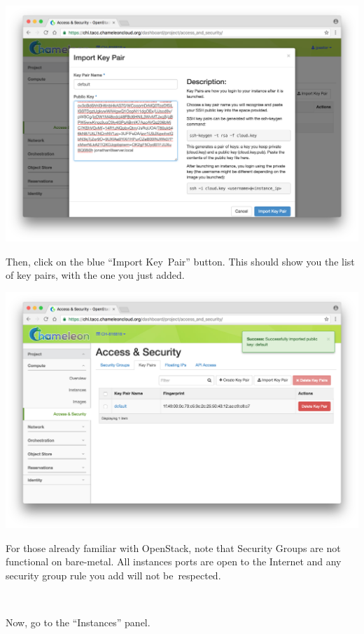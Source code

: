 \includegraphics[width=\columnwidth]{images/chameleon/Screen-Shot-2016-10-26-at-14-37-18.png}

Then, click on the blue ``Import Key~Pair'' button. This should show you
the list of key pairs, with the one you just added.

\includegraphics[width=\columnwidth]{images/chameleon/Screen-Shot-2016-10-26-at-14-37-52.png}

For those already familiar with OpenStack, note that Security Groups are
not functional on bare-metal. All instances ports are open to the
Internet and any security group rule you add will not be~respected.

~

Now, go to the ``Instances'' panel.

